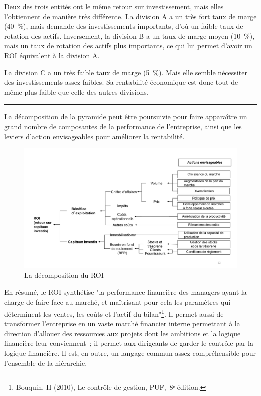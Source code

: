 \documentclass[oneside]{kaobook}
\begin{document}
Deux des trois entités ont le même retour sur investissement, mais elles l'obtiennent de manière très différente. La division A a un très fort taux de marge (40 \%), mais demande des investissements importants, d'où un faible taux de rotation des actifs. Inversement, la division B a un taux de marge moyen (10 \%), mais un taux de rotation des actifs plus importants, ce qui lui permet d'avoir un ROI équivalent à la division A.

La division C a un très faible taux de marge (5 \%). Mais elle semble nécessiter des investissements assez faibles. Sa rentabilité économique est donc tout de même plus faible que celle des autres divisions.

\noindent\rule{\textwidth}{0.5pt}

La décomposition de la pyramide peut être poursuivie pour faire apparaître un grand nombre de composantes de la performance de l'entreprise, ainsi que les leviers d'action envisageables pour améliorer la rentabilité.

\begin{figure}[H]

\includegraphics{./img/roidetail.pdf}
\caption{La décomposition du ROI}
\end{figure}

En résumé, le ROI synthétise "la performance financière des managers ayant la charge de faire face au marché, et maîtrisant pour cela les paramètres qui déterminent les ventes, les coûts et l'actif du bilan"\footnote{Bouquin, H (2010), Le contrôle de gestion, PUF, 8ᵉ édition.}. Il permet aussi de transformer l'entreprise en un vaste marché financier interne permettant à la direction d'allouer des ressources aux projets dont les ambitions et la logique financière leur conviennent ; il permet aux dirigeants de garder le contrôle par la logique financière. Il est, en outre, un langage commun assez compréhensible pour l'ensemble de la hiérarchie.
\end{document}
